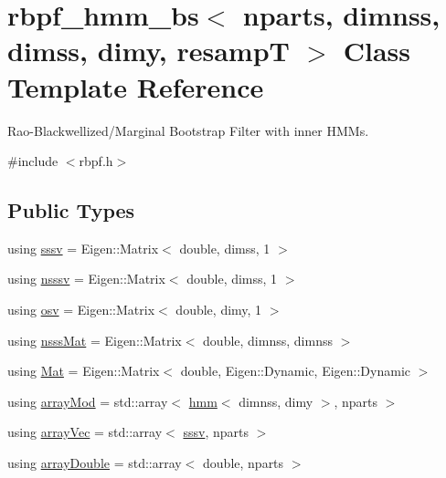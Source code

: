 \hypertarget{classrbpf__hmm__bs}{}\section{rbpf\+\_\+hmm\+\_\+bs$<$ nparts, dimnss, dimss, dimy, resampT $>$ Class Template Reference}
\label{classrbpf__hmm__bs}


Rao-\/\+Blackwellized/\+Marginal Bootstrap Filter with inner H\+M\+Ms.  




{\ttfamily \#include $<$rbpf.\+h$>$}

\subsection*{Public Types}
\begin{DoxyCompactItemize}
\item 
using \hyperlink{classrbpf__hmm__bs_aba47e4a45bf4ac6913f4419f9512f97f}{sssv} = Eigen\+::\+Matrix$<$ double, dimss, 1 $>$
\item 
using \hyperlink{classrbpf__hmm__bs_ad348eec8ba6e192775ff7a7b4a288809}{nsssv} = Eigen\+::\+Matrix$<$ double, dimss, 1 $>$
\item 
using \hyperlink{classrbpf__hmm__bs_a9a830ec4bbd37d4922011165aa5a8037}{osv} = Eigen\+::\+Matrix$<$ double, dimy, 1 $>$
\item 
using \hyperlink{classrbpf__hmm__bs_a1bd1ebb6af375d962ba266b4ed5434a1}{nsss\+Mat} = Eigen\+::\+Matrix$<$ double, dimnss, dimnss $>$
\item 
using \hyperlink{classrbpf__hmm__bs_a8f6996a1394c31ac65859de96f195f3a}{Mat} = Eigen\+::\+Matrix$<$ double, Eigen\+::\+Dynamic, Eigen\+::\+Dynamic $>$
\item 
using \hyperlink{classrbpf__hmm__bs_a9772cd625f6a416ccd54558108b1d7a3}{array\+Mod} = std\+::array$<$ \hyperlink{classhmm}{hmm}$<$ dimnss, dimy $>$, nparts $>$
\item 
using \hyperlink{classrbpf__hmm__bs_a18441e40d4353bf4b91e6cbac001a28b}{array\+Vec} = std\+::array$<$ \hyperlink{classrbpf__hmm__bs_aba47e4a45bf4ac6913f4419f9512f97f}{sssv}, nparts $>$
\item 
using \hyperlink{classrbpf__hmm__bs_a97b5eab2c1fc8acffbdb8941432e8c00}{array\+Double} = std\+::array$<$ double, nparts $>$
\end{DoxyCompactItemize}
